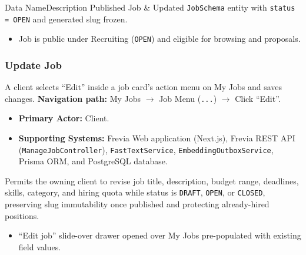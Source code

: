 \begin{specdatatable}{Data Name}{Description}
Published Job & Updated \texttt{JobSchema} entity with \texttt{status = OPEN} and generated slug frozen.\\ \hline
\end{specdatatable}

\begin{itemize}[leftmargin=1.6em,topsep=3pt,itemsep=2pt,parsep=0pt,label=$\bullet$]
    \item Job is public under Recruiting (\texttt{OPEN}) and eligible for browsing and proposals.
\end{itemize}

\subsubsection{Update Job}

A client selects ``Edit'' inside a job card's action menu on My Jobs and saves changes.\newline
\textbf{Navigation path:} My Jobs $\rightarrow$ Job Menu (\texttt{...}) $\rightarrow$ Click ``Edit''.


\begin{itemize}[leftmargin=1.6em,topsep=3pt,itemsep=2pt,parsep=0pt,label=$\bullet$]
    \item \textbf{Primary Actor:} Client.
    \item \textbf{Supporting Systems:} Frevia Web application (Next.js), Frevia REST API (\texttt{ManageJobController}), \texttt{FastTextService}, \texttt{EmbeddingOutboxService}, Prisma ORM, and PostgreSQL database.
\end{itemize}

\noindent Permits the owning client to revise job title, description, budget range, deadlines, skills, category, and hiring quota while status is \texttt{DRAFT}, \texttt{OPEN}, or \texttt{CLOSED}, preserving slug immutability once published and protecting already-hired positions.

\begin{itemize}[leftmargin=1.6em,topsep=3pt,itemsep=2pt,parsep=0pt,label=$\bullet$]
    \item ``Edit job'' slide-over drawer opened over My Jobs pre-populated with existing field values.
\end{itemize}

